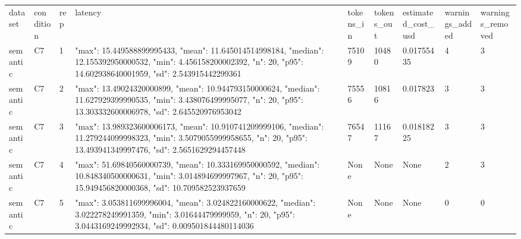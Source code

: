 \begin{tabular}{lllllllll}
dataset & condition & rep & latency & tokens\_in & tokens\_out & estimated\_cost\_usd & warnings\_added & warnings\_removed \\
semantic & C7 & 1 & {"max": 15.449588899995433, "mean": 11.645014514998184, "median": 12.155392950000532, "min": 4.456158200002392, "n": 20, "p95": 14.602938640001959, "sd": 2.543915442299361} & 75109 & 10480 & 0.01755435 & 4 & 3 \\
semantic & C7 & 2 & {"max": 13.49024320000899, "mean": 10.944793150000624, "median": 11.627929399990535, "min": 3.438076499995077, "n": 20, "p95": 13.303332600006978, "sd": 2.645520976953042} & 75556 & 10816 & 0.017823 & 3 & 3 \\
semantic & C7 & 3 & {"max": 13.989323600006173, "mean": 10.910741209999106, "median": 11.279244099998323, "min": 3.5079055999958655, "n": 20, "p95": 13.493941349997476, "sd": 2.5651629294457448} & 76547 & 11167 & 0.01818225 & 3 & 3 \\
semantic & C7 & 4 & {"max": 51.69840560000739, "mean": 10.333169950000592, "median": 10.848340500000631, "min": 3.014894699997967, "n": 20, "p95": 15.949456820000368, "sd": 10.709582523937659} & None & None & None & 2 & 3 \\
semantic & C7 & 5 & {"max": 3.053811699996004, "mean": 3.024822160000622, "median": 3.022278249991359, "min": 3.01644479999959, "n": 20, "p95": 3.0443169249992934, "sd": 0.009501844480114036} & None & None & None & 0 & 0 \\
\end{tabular}